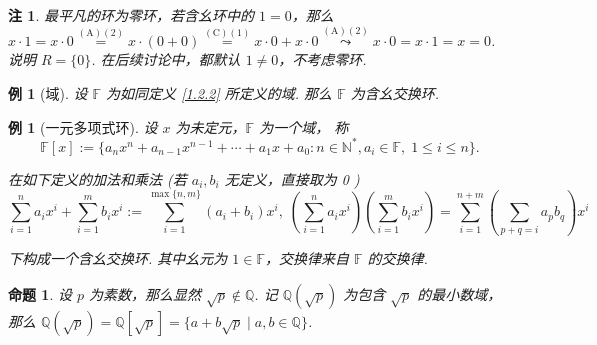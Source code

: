 \documentclass[10pt,openany]{article}
\theoremstyle{thmstyle} %
\theoremstyle{defstyle} %
\theoremstyle{prostyle} %
\newtheorem{proposition}[theorem]{命题}
\theoremstyle{exastyle}
\newtheorem{example}[theorem]{例}
\theoremstyle{remstyle}
\newtheorem{remark}[theorem]{注}
\newcommand{\F}{\mathbb{F}}
\begin{document}
\begin{remark}
	最平凡的环为零环，若含幺环中的 \( 1=0 \)，那么 \( x \cdot 1= x \cdot 0 \overset{(\text{A})(2)}{=} x \cdot (0+0) \overset{(\text{C})(1)}{=} x \cdot 0+ x \cdot 0 \overset{(\text{A})(2)}{\leadsto} x \cdot 0=x \cdot 1=x=0 \). 说明 \( R=\{0\} \). 在后续讨论中，都默认 \( 1 \neq 0 \)，不考虑零环.
\end{remark}

\begin{example}[域]
	设 \( \F \) 为如同定义 \ref{1.2.2} 所定义的域. 那么 \( \F \) 为含幺交换环. 
\end{example}

\begin{example}[一元多项式环]
	设 \( x \) 为未定元，\( \F \) 为一个域， 称
	\[ \F[x]:=\{ a_nx^n+a_{n-1}x^{n-1}+\cdots+a_1x+a_0 : n \in \mathbb{N}^*, a_i \in \F, \; 1 \leq i \leq n \}. \]
	
	在如下定义的加法和乘法 (若 \( a_i, b_i \) 无定义，直接取为 0 )
	\[ \sum_{i=1}^{n} a_ix^i + \sum_{i=1}^{m} b_ix^i:= \sum_{i=1}^{\max\{n,m\}} (a_i+b_i)x^i, \; \left( \sum_{i=1}^{n} a_ix^i \right)\left( \sum_{i=1}^{m} b_ix^i \right)= \sum_{i=1}^{n+m} \left( \sum_{p+q=i}^{} a_pb_q \right) x^i \]
	
	下构成一个含幺交换环. 其中幺元为 \( 1 \in \F \)，交换律来自 \( \F \) 的交换律. 
\end{example}

\begin{proposition}
	设 \( p \) 为素数，那么显然 \( \sqrt{p} \notin \mathbb{Q} \). 记 \( \mathbb{Q}(\sqrt{p}) \) 为包含 \( \sqrt{p} \) 的最小数域，那么 \( \mathbb{Q}(\sqrt{p})=\mathbb{Q}[\sqrt{p}]=\{ a+b\sqrt{p} \mid a,b \in \mathbb{Q} \} \).
	\label{1.2.12}
\end{proposition}
\end{document}
